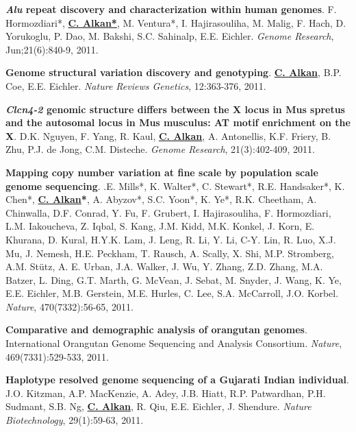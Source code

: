 \documentclass[margin,line]{res}
\begin{document}
\begin{resume}
\vspace{-.2cm}
{\bf \textit {Alu} repeat discovery and characterization within human genomes}.
F. Hormozdiari*, {\bf {\underline {C. Alkan*}}}, M. Ventura*, I. Hajirasouliha, M. Malig, 
F. Hach, D. Yorukoglu, P. Dao, M. Bakshi, S.C. Sahinalp, E.E. Eichler.
{\em Genome Research}, Jun;21(6):840-9, 2011.

\vspace{-.2cm}
{\bf Genome structural variation discovery and genotyping}. 
{\bf {\underline {C. Alkan}}}, B.P. Coe, E.E. Eichler.
{\em Nature Reviews Genetics}, 12:363-376, 2011.


\vspace{-.2cm}
{\bf {\em Clcn4-2} genomic structure differs between the X locus in Mus spretus and the autosomal 
locus in Mus musculus: AT motif enrichment on the X}.  
D.K. Nguyen, F. Yang, R. Kaul, {\bf {\underline {C. Alkan}}}, A. Antonellis, K.F. Friery, 
B. Zhu, P.J. de Jong, C.M. Disteche. 
{\em Genome Research}, 21(3):402-409, 2011.


\vspace{-.2cm}
{\bf Mapping copy number variation at fine scale by population scale genome sequencing}.
.E. Mills*, K. Walter*, C. Stewart*, R.E. Handsaker*, K. Chen*, 
{\bf {\underline {C. Alkan}*}}, A. Abyzov*, S.C. Yoon*, K. Ye*, R.K. Cheetham, 
A. Chinwalla, D.F. Conrad, Y. Fu, F. Grubert, I. Hajirasouliha, 
F. Hormozdiari, L.M. Iakoucheva, Z. Iqbal, S. Kang, J.M. Kidd, 
M.K. Konkel, J. Korn, E. Khurana, D. Kural, H.Y.K. Lam, J. Leng, 
R. Li, Y. Li, C-Y. Lin, R. Luo, X.J. Mu, J. Nemesh,
H.E. Peckham, T. Rausch, A. Scally, X. Shi, M.P. Stromberg, 
A.M. St\"{u}tz, A. E. Urban, J.A. Walker, J. Wu, Y. Zhang, 
Z.D. Zhang, M.A. Batzer, L. Ding, G.T. Marth, G. McVean, 
J. Sebat, M. Snyder, J. Wang, K. Ye, E.E. Eichler, 
M.B. Gerstein, M.E. Hurles, C. Lee, S.A. McCarroll,  J.O. Korbel.
{\em Nature}, 470(7332):56-65, 2011.


\vspace{-.2cm}
{\bf Comparative and demographic analysis of orangutan genomes}. 
International Orangutan Genome Sequencing and Analysis Consortium.
{\em Nature}, 469(7331):529-533, 2011.

\vspace{-.2cm}
{\bf Haplotype resolved genome sequencing of a Gujarati Indian individual}.
J.O. Kitzman, A.P. MacKenzie, A. Adey, J.B. Hiatt, R.P. Patwardhan, 
P.H. Sudmant, S.B. Ng, {\bf {\underline{C. Alkan}}}, R. Qiu, E.E.
Eichler, J. Shendure.
{\em Nature Biotechnology}, 29(1):59-63, 2011.


\end{resume}
\end{document}
